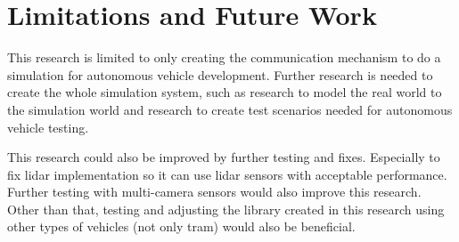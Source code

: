 \section{Limitations and Future Work}

This research is limited to only creating the communication mechanism to do a
simulation for autonomous vehicle development. Further research is needed to
create the whole simulation system, such as research to model the real world to
the simulation world and research to create test scenarios needed for autonomous
vehicle testing.

This research could also be improved by further testing and fixes. Especially to
fix lidar implementation so it can use lidar sensors with acceptable performance.
Further testing with multi-camera sensors would also improve this research. Other
than that, testing and adjusting the library created in this research using
other types of vehicles (not only tram) would also be beneficial.